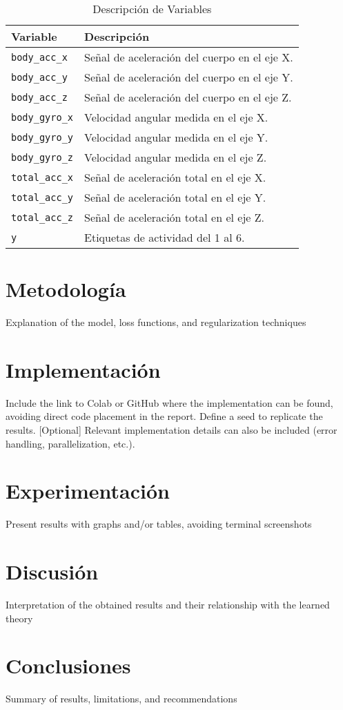 \documentclass[conference]{IEEEtran}
\begin{document}
\begin{table}[htbp]
    \caption{Descripción de Variables}
    \begin{center}
        \begin{tabular}{|l|l|}
        \hline
        \textbf{Variable} & \textbf{Descripción} \\
        \hline
        \texttt{body\_acc\_x} & Señal de aceleración del cuerpo en el eje X.\\
        \hline
        \texttt{body\_acc\_y} & Señal de aceleración del cuerpo en el eje Y.\\
        \hline
        \texttt{body\_acc\_z} & Señal de aceleración del cuerpo en el eje Z.\\
        \hline
        \texttt{body\_gyro\_x} & Velocidad angular medida en el eje X.\\
        \hline
        \texttt{body\_gyro\_y} & Velocidad angular medida en el eje Y. \\
        \hline
        \texttt{body\_gyro\_z} & Velocidad angular medida en el eje Z. \\
        \hline
        \texttt{total\_acc\_x} & Señal de aceleración total en el eje X. \\
        \hline
        \texttt{total\_acc\_y} & Señal de aceleración total en el eje Y. \\
        \hline
        \texttt{total\_acc\_z} & Señal de aceleración total en el eje Z. \\
        \hline
        \texttt{y} & Etiquetas de actividad del 1 al 6. \\
        \hline
        \end{tabular}
        \label{tab1}
    \end{center}
\end{table}

\section{Metodología}
Explanation of the model, loss functions, and regularization techniques

\section{Implementación}
Include the link to Colab or GitHub where the implementation can be found, avoiding direct
code placement in the report. Define a seed to replicate the results. [Optional] Relevant implementation
details can also be included (error handling, parallelization, etc.).

\section{Experimentación}
Present results with graphs and/or tables, avoiding terminal screenshots

\section{Discusión}
Interpretation of the obtained results and their relationship with the learned theory

\section{Conclusiones}
Summary of results, limitations, and recommendations
\end{document}
